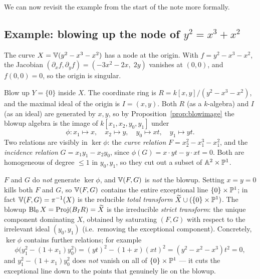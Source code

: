 \documentclass[11pt]{article}
\begin{document}
We can now revisit the example from the start of the note more formally.

\subsection*{Example: blowing up the node of $y^2 = x^3 + x^2$}

The curve $X = \V(y^2 - x^3 - x^2)$ has a node at the origin. With $f = y^2 - x^3 - x^2$, the Jacobian $(\partial_x f, \partial_y f) = (-3x^2 - 2x,\; 2y)$ vanishes at $(0,0)$, and $f(0,0)=0$, so the origin is singular.

Blow up $Y = \{0\}$ inside $X$. The coordinate ring is $R = k[x,y]/(y^2 - x^3 - x^2)$, and the maximal ideal of the origin is $I = (x, y)$. Both $R$ (as a $k$-algebra) and $I$ (as an ideal) are generated by $x, y$, so by Proposition~\ref{prop:blowimage} the blowup algebra is the image of $k[x_1, x_2, y_0, y_1]$ under
\[\phi: x_1 \mapsto x, \quad x_2 \mapsto y, \quad y_0 \mapsto xt, \quad y_1 \mapsto yt.\]
Two relations are visibly in $\ker\phi$: the \emph{curve relation} $F = x_2^2 - x_1^3 - x_1^2$, and the \emph{incidence relation} $G = x_1 y_1 - x_2 y_0$, since $\phi(G) = x\cdot yt - y\cdot xt = 0$. Both are homogeneous of degree $\leq 1$ in $y_0, y_1$, so they cut out a subset of $\A^2 \times \P^1$.

\begin{remark}
    $F$ and $G$ do \emph{not} generate $\ker\phi$, and $\V(F,G)$ is \emph{not} the blowup. Setting $x=y=0$ kills both $F$ and $G$, so $\V(F,G)$ contains the entire exceptional line $\{0\}\times\P^1$; in fact $\V(F,G) = \pi^{-1}(X)$ is the reducible \emph{total transform} $\widetilde X \cup (\{0\}\times\P^1)$. The blowup $\Bl_0 X = \Proj(B_I R) = \widetilde X$ is the irreducible \emph{strict transform}: the unique component dominating $X$, obtained by saturating $(F,G)$ with respect to the irrelevant ideal $(y_0, y_1)$ (i.e.\ removing the exceptional component). Concretely, $\ker\phi$ contains further relations; for example
    \[\phi\big(y_1^2 - (1+x_1)y_0^2\big) = (yt)^2 - (1+x)(xt)^2 = (y^2 - x^2 - x^3)t^2 = 0,\]
    and $y_1^2 - (1+x_1)y_0^2$ does \emph{not} vanish on all of $\{0\}\times\P^1$ --- it cuts the exceptional line down to the points that genuinely lie on the blowup.
\end{remark}
\end{document}
